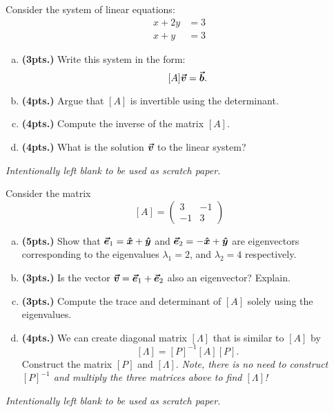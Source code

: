 \documentclass[12pt]{amsbook}
\begin{document}
\newpage
\begin{problem} 
Consider the system of linear equations:
\begin{align*}
    x + 2y &= 3\\
    x + y  &= 3
\end{align*}
\begin{enumerate}[(a)]
    \item \textbf{(3pts.)} Write this system in the form:
    \[
    [A]\boldsymbol{\boldsymbol{\vec{v}}} = \boldsymbol{\boldsymbol{\vec{b}}}.
    \]
    \vspace*{3cm}
    \item \textbf{(4pts.)} Argue that $[A]$ is invertible using the determinant.
    \vspace*{5cm}
    \item \textbf{(4pts.)} Compute the inverse of the matrix $[A]$.
    \vspace*{6cm}
    \item \textbf{(4pts.)} What is the solution $\boldsymbol{\boldsymbol{\vec{v}}}$ to the linear system?
\end{enumerate}
\end{problem}

\newpage
\emph{Intentionally left blank to be used as scratch paper.}\\


\newpage
\begin{problem}
Consider the matrix
\[
[A]=\begin{pmatrix} 3 & -1\\ -1 & 3 \end{pmatrix}
\]
\begin{enumerate}[(a)]
    \item \textbf{(5pts.)} Show that $\boldsymbol{\vec{e}}_{1}=\boldsymbol{\hat{x}}+\boldsymbol{\hat{y}}$ and $\boldsymbol{\vec{e}}_2=-\boldsymbol{\hat{x}}+\boldsymbol{\hat{y}}$ are eigenvectors corresponding to the eigenvalues $\lambda_1=2$, and $\lambda_2=4$ respectively.
    \vspace*{4cm}
    \item \textbf{(3pts.)} Is the vector $\boldsymbol{\boldsymbol{\vec{v}}}=\boldsymbol{\vec{e}}_1+\boldsymbol{\vec{e}}_2$ also an eigenvector? Explain.
    \vspace*{4cm}
    \item \textbf{(3pts.)} Compute the trace and determinant of $[A]$ solely using the eigenvalues.
    \vspace{4cm}
    \item \textbf{(4pts.)} We can create diagonal matrix $[\Lambda]$ that is similar to $[A]$ by
    \[
    [\Lambda] = [P]^{-1}[A][P].
    \]
    Construct the matrix $[P]$ and $[\Lambda]$. \emph{Note, there is no need to construct $[P]^{-1}$ and multiply the three matrices above to find $[\Lambda]$!}
\end{enumerate}
\end{problem}

\newpage
\emph{Intentionally left blank to be used as scratch paper.}\\
\end{document}

